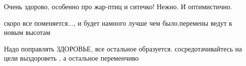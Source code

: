 \begin{itemize}
 
Очень здорово, особенно про жар-птиц и ситечко! Нежно. И оптимистично.

 
скоро все поменяется..., и будет намного лучше чем было.перемены ведут к новым высотам

 
Надо поправлять ЗДОРОВЬЕ, все остальное образуется. сосредотачивайтесь на цели выздороветь , а остальное переменчиво
\end{itemize}


